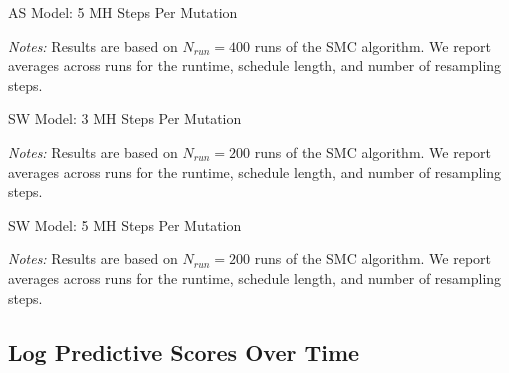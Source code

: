 \documentclass[12pt]{article}
\theoremstyle{definition}
\newcommand\plotroot{../figures_for_paper}
\begin{document}
\begin{table}[H]
	\caption{AS Model: 5 MH Steps Per Mutation}
	\label{appsubsec:as.smcsummary}
	\begin{center}
		
	\end{center}
	{\footnotesize {\em Notes:} Results are based on $N_{run} = 400$ runs of the SMC algorithm. We report averages across runs for the runtime, schedule length, and number of resampling steps.}\setlength{\baselineskip}{4mm}
\end{table}

\clearpage

\begin{table}[H]
	\caption{SW Model: 3 MH Steps Per Mutation}
	\label{appsubsec:sw.smcsummary}
	\begin{center}
		
	\end{center}
	{\footnotesize {\em Notes:} Results are based on $N_{run} = 200$ runs of the SMC algorithm. We report averages across runs for the runtime, schedule length, and number of resampling steps.}\setlength{\baselineskip}{4mm}
\end{table}



\begin{table}[H]
	\caption{SW Model: 5 MH Steps Per Mutation}
	\label{appsubsec:sw.smcsummary}
	\begin{center}
		
	\end{center}
	{\footnotesize {\em Notes:} Results are based on $N_{run} = 200$ runs of the SMC algorithm. We report averages across runs for the runtime, schedule length, and number of resampling steps.}\setlength{\baselineskip}{4mm}
\end{table}

\clearpage

\subsection{Log Predictive Scores Over Time}
\label{appsubsec:predictive_densities_over_time}
\end{document}
